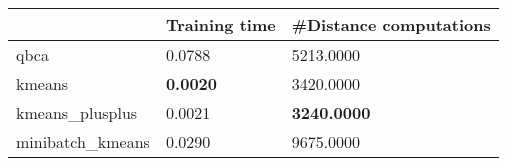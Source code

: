 \begin{table}[htbp]
\centering
\begin{tabular}{lll}
\toprule
 & Training time & #Distance computations \\
\midrule
qbca & 0.0788 & 5213.0000 \\
kmeans & \textbf{0.0020} & 3420.0000 \\
kmeans_plusplus & 0.0021 & \textbf{3240.0000} \\
minibatch_kmeans & 0.0290 & 9675.0000 \\
\bottomrule
\end{tabular}
\end{table}
